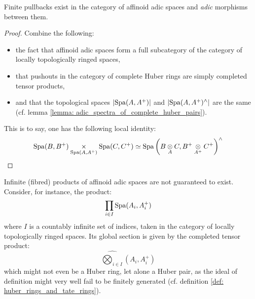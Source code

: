             \begin{proposition} \label{prop: pullbacks_of_affinoid_adic_spaces_along_adic_morphisms}
                Finite pullbacks exist in the category of affinoid adic spaces and \textit{adic} morphisms between them.
            \end{proposition}
                \begin{proof}
                    Combine the following:
                        \begin{itemize}
                            \item the fact that affinoid adic spaces form a full subcategory of the category of locally topologically ringed spaces,
                            \item that pushouts in the category of complete Huber rings are simply completed tensor products,
                            \item and that the topological spaces $|\mathrm{Spa}(A, A^+)|$ and $|\mathrm{Spa}(A, A^+)^{\wedge}|$ are the same (cf. lemma \ref{lemma: adic_spectra_of_complete_huber_pairs}).
                        \end{itemize}
                    This is to say, one has the following local identity:
                        $$\Spa(B, B^+) \x_{\Spa(A, A^+)} \Spa(C, C^+) \cong \Spa\left(B \tensor_A C, B^+ \tensor_{A^+} C^+\right)^{\wedge}$$
                \end{proof}
            \begin{remark}
                Infinite (fibred) products of affinoid adic spaces are not guaranteed to exist. Consider, for instance, the product:
                    $$\prod_{i \in I} \mathrm{Spa}(A_i, A_i^+)$$
                where $I$ is a countably infinite set of indices, taken in the category of locally topologically ringed spaces. Its global section is given by the completed tensor product:
                    $$\widehat{\bigotimes_{i \in I}} (A_i, A_i^+)$$
                which might not even be a Huber ring, let alone a Huber pair, as the ideal of definition might very well fail to be finitely generated (cf. definition \ref{def: huber_rings_and_tate_rings}).  
            \end{remark}
